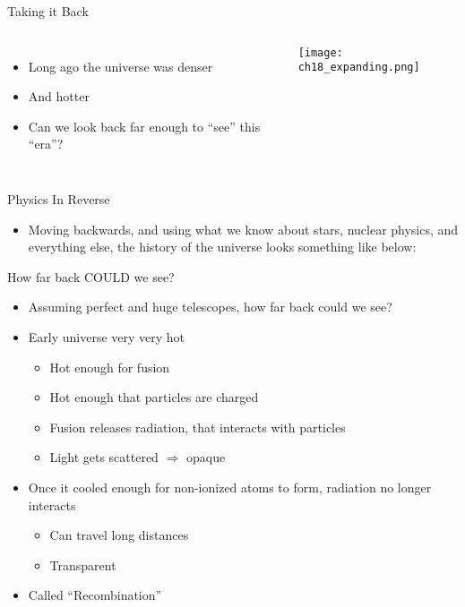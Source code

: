 \documentclass[pdf,aspectratio=169]{beamer}
\begin{document}
\begin{frame}{Taking it Back}
  \begin{columns}
	\begin{itemize}
	  \item Long ago the universe was denser
	  \item And hotter
	  \item Can we look back far enough to ``see'' this ``era''?
	\end{itemize}
	\begin{center}
	  \texttt{[image: ch18\_expanding.png]}
	\end{center}
  \end{columns}
\end{frame}

\begin{frame}{Physics In Reverse}
  \begin{itemize}
	\item Moving backwards, and using what we know about stars, nuclear physics, and everything else, the history of the universe looks something like below:
  \end{itemize}
  \begin{center}
  \end{center}
\end{frame}

\begin{frame}{How far back COULD we see?}
  \begin{itemize}
	\item Assuming perfect and huge telescopes, how far back could we see?
	\item Early universe very very hot
	  \begin{itemize}
		\item Hot enough for fusion
		\item Hot enough that particles are charged
		\item Fusion releases radiation, that interacts with particles
		\item Light gets scattered $\Rightarrow$ opaque
	  \end{itemize}
	\item Once it cooled enough for non-ionized atoms to form, radiation no longer interacts
	  \begin{itemize}
		\item Can travel long distances
		\item Transparent
	  \end{itemize}
	\item Called ``Recombination''
  \end{itemize}
\end{frame}
\end{document}
